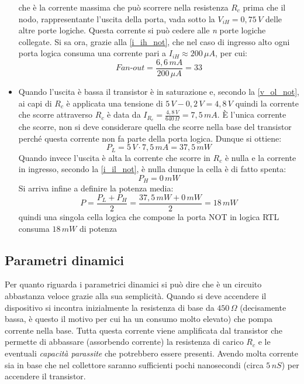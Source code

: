 \documentclass[12pt, a4paper]{report}
\begin{document}
\begin{itemize}
\begin{equation*}
    \end{equation*}
    che è la corrente massima che può scorrere nella resistenza $R_c$ prima che il nodo, rappresentante l'uscita della porta, vada sotto la $V_{iH} = 0,75\,V$ delle altre porte logiche. Questa corrente si può cedere alle \textit{n} porte logiche collegate. Si sa ora, grazie alla \eqref{i_ih_not}, che nel caso di ingresso alto ogni porta logica consuma una corrente pari a $I_{iH} \approx 200\,\mu A$, per cui:
    \begin{equation}
        \textit{Fan-out} = \frac{6,6\,mA}{200\,\mu A} = 33
    \end{equation}
    \item Quando l'uscita è bassa il transistor è in saturazione e, secondo la \eqref{v_ol_not}, ai capi di $R_c$ è applicata una tensione di $5\,V - 0,2\,V = 4,8\,V$ quindi la corrente che scorre attraverso $R_c$ è data da $I_{R_{c}} = \frac{4,8\,V}{640\,\Omega} = 7,5\,mA$. È l'unica corrente che scorre, non si deve considerare quella che scorre nella base del transistor perché questa corrente non fa parte della porta logica. Dunque si ottiene:
    \begin{equation*}
        P_{L} = 5\,V \cdot 7,5\,mA = 37,5\,mW
    \end{equation*}
    Quando invece l'uscita è alta la corrente che scorre in $R_c$ è nulla e la corrente in ingresso, secondo la \eqref{i_il_not}, è nulla dunque la cella è di fatto spenta:
    \begin{equation*}
        P_{H} = 0\,mW
    \end{equation*}
    Si arriva infine a definire la potenza media:
    \begin{equation}
        P = \frac{P_{L} + P_{H}}{2} = \frac{37,5\,mW + 0\,mW}{2} = 18\,mW
    \end{equation}
    quindi una singola cella logica che compone la porta NOT in logica RTL consuma $18\,mW$ di potenza
\end{itemize}

\subsection{Parametri dinamici}
Per quanto riguarda i parametrici dinamici si può dire che è un circuito abbastanza veloce grazie alla sua semplicità. Quando si deve accendere il dispositivo si incontra inizialmente la resistenza di base da $450\,\Omega$ (decisamente bassa, è questo il motivo per cui ha un consumo molto elevato) che pompa corrente nella base. Tutta questa corrente viene amplificata dal transistor che permette di abbassare (assorbendo corrente) la resistenza di carico $R_c$ e le eventuali \textit{capacità parassite} che potrebbero essere presenti. Avendo molta corrente sia in base che nel collettore saranno sufficienti pochi nanosecondi (circa $5\,nS$) per accendere il transistor.
\end{document}

